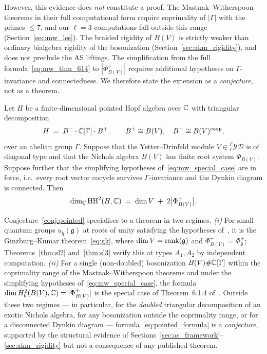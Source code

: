 However, this evidence does \emph{not} constitute a proof. The Mastnak--Witherspoon theorems in their full computational form require coprimality of $|\Gamma|$ with the primes $\leq 7$, and our $\ell = 3$ computations fall outside this range (Section~\ref{sec:mw_les}). The braided rigidity of $B(V)$ is strictly weaker than ordinary bialgebra rigidity of the bosonization (Section~\ref{sec:akm_rigidity}), and does not preclude the AS liftings. The simplification from the full formula~\eqref{eq:mw_thm_614} to $|\Phi^+_{B(V)}|$ requires additional hypotheses on $\Gamma$-invariance and connectedness. We therefore state the extension as a \emph{conjecture}, not as a theorem.

\begin{conjecture}
\label{conj:pointed}
Let $H$ be a finite-dimensional pointed Hopf algebra over $\mathbb{C}$ with triangular decomposition
\[
H \;=\; B^{-} \cdot \mathbb{C}[\Gamma] \cdot B^{+}, \qquad B^{+} \cong B(V),\quad B^{-} \cong B(V)^{\mathrm{coop}},
\]
over an abelian group $\Gamma$. Suppose that the Yetter--Drinfeld module $V \in {}^{\Gamma}_{\Gamma}\mathcal{YD}$ is of diagonal type and that the Nichols algebra $B(V)$ has finite root system $\Phi_{B(V)}$. Suppose further that the simplifying hypotheses of~\eqref{eq:mw_special_case} are in force, i.e.\ every root vector cocycle survives $\Gamma$-invariance and the Dynkin diagram is connected. Then
\begin{equation}
\label{eq:pointed_formula}
\dim_{\mathbb{C}} \operatorname{HH}^2(H, \mathbb{C}) \;=\; \dim V \;+\; 2\bigl|\Phi^+_{B(V)}\bigr|.
\end{equation}
\end{conjecture}

\noindent
Conjecture~\ref{conj:pointed} specialises to a theorem in two regimes. \emph{(i)} For small quantum groups $u_q(\mathfrak{g})$ at roots of unity satisfying the hypotheses of~\cite{GK93}, it is the Ginzburg--Kumar theorem~\eqref{eq:gk}, where $\dim V = \operatorname{rank}(\mathfrak{g})$ and $\Phi^+_{B(V)} = \Phi^+_\mathfrak{g}$; Theorems~\ref{thm:sl2} and~\ref{thm:sl3} verify this at types $A_1, A_2$ by independent computation. \emph{(ii)} For a single (non-doubled) bosonization $B(V) \# \mathbb{C}[\Gamma]$ within the coprimality range of the Mastnak--Witherspoon theorems and under the simplifying hypotheses of~\eqref{eq:mw_special_case}, the formula $\dim \tilde{H}^2_b(B(V), \mathbb{C}) = |\Phi^+_{B(V)}|$ is the special case of Theorem~6.1.4 of~\cite{MW08}. Outside these two regimes --- in particular, for the \emph{doubled} triangular decomposition of an exotic Nichols algebra, for any bosonization outside the coprimality range, or for a disconnected Dynkin diagram --- formula~\eqref{eq:pointed_formula} is a \emph{conjecture}, supported by the structural evidence of Sections~\ref{sec:as_framework}--\ref{sec:akm_rigidity} but not a consequence of any published theorem.

